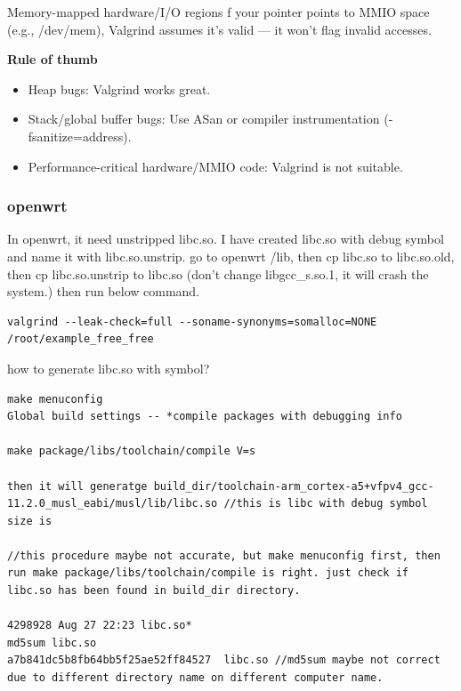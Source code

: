 \documentclass[paper=8.5in:11in, twoside, 12pt, pagesize=pdftex]{book}
\begin{document}
Memory-mapped hardware/I/O regions
f your pointer points to MMIO space (e.g., /dev/mem), Valgrind assumes it’s valid — it won’t flag invalid accesses.




\textbf{Rule of thumb}
\begin{itemize}
\item Heap bugs:  Valgrind works great.

\item Stack/global buffer bugs: Use ASan or compiler instrumentation (-fsanitize=address).

\item Performance-critical hardware/MMIO code: Valgrind is not suitable.
\end{itemize}





\subsubsection{openwrt}

In openwrt, it need unstripped libc.so. I have created libc.so with debug symbol and name it with libc.so.unstrip.  go to openwrt /lib, then cp libc.so to libc.so.old, then cp libc.so.unstrip to libc.so (don't change libgcc\_s.so.1, it will crash the system.) then run below command.  
\begin{lstlisting}
valgrind --leak-check=full --soname-synonyms=somalloc=NONE /root/example_free_free
\end{lstlisting}

how to generate libc.so with symbol? 
\begin{lstlisting}
make menuconfig
Global build settings -- *compile packages with debugging info

make package/libs/toolchain/compile V=s

then it will generatge build_dir/toolchain-arm_cortex-a5+vfpv4_gcc-11.2.0_musl_eabi/musl/lib/libc.so //this is libc with debug symbol
size is 

//this procedure maybe not accurate, but make menuconfig first, then run make package/libs/toolchain/compile is right. just check if libc.so has been found in build_dir directory. 

4298928 Aug 27 22:23 libc.so*
md5sum libc.so 
a7b841dc5b8fb64bb5f25ae52ff84527  libc.so //md5sum maybe not correct due to different directory name on different computer name. 
\end{lstlisting}
\end{document}
